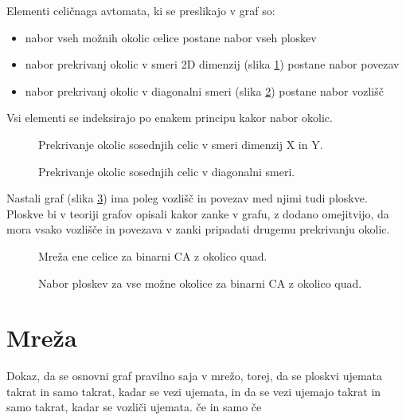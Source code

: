 \documentclass[12pt,a4paper,openany]{book}
\begin{document}
Elementi celičnaga avtomata, ki se preslikajo v graf so:
\begin{itemize}[noitemsep,nolistsep]
\item nabor vseh možnih okolic celice postane nabor vseh ploskev
\item nabor prekrivanj okolic v smeri 2D dimenzij (slika \ref{overlap_dimension}) postane nabor povezav
\item nabor prekrivanj okolic v diagonalni smeri (slika \ref{overlap_diagonal}) postane nabor vozlišč
\end{itemize}
Vsi elementi se indeksirajo po enakem principu kakor nabor okolic.

\begin{figure}[htb]
\centerline{}
\caption[Prekrivaje okolic.]{Prekrivanje okolic sosednjih celic v smeri dimenzij X in Y.}
\label{overlap_dimension}
\end{figure}

\begin{figure}[htb]
\centerline{}
\caption[Prekrivanje okolic - diagonalno.]{Prekrivanje okolic sosednjih celic v diagonalni smeri.}
\label{overlap_diagonal}
\end{figure}

Nastali graf (slika \ref{network_single}) ima poleg vozlišč in povezav med njimi tudi ploskve. Ploskve bi v teoriji grafov
opisali kakor zanke v grafu, z dodano omejitvijo, da mora vsako vozlišče in povezava v zanki
pripadati drugemu prekrivanju okolic.

\begin{figure}[htb]
\centerline{}
\caption[Mreža ene celice.]{Mreža ene celice za binarni CA z okolico quad.}
\label{network_single}
\end{figure}

\begin{figure}[htb]
\centerline{}
\caption[Nabor ploskev.]{Nabor ploskev za vse možne okolice za binarni CA z okolico quad.}
\label{neighborhood_surfaces}
\end{figure}

\section{Mreža}

Dokaz, da se osnovni graf pravilno saja v mrežo,
torej, da se ploskvi ujemata takrat in samo takrat, kadar se vezi ujemata,
in da se vezi ujemajo takrat in samo takrat, kadar se vozliči ujemata.
če in samo če
\end{document}

